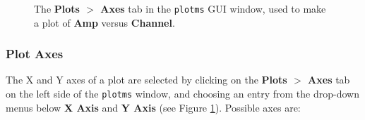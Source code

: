 
\begin{figure}[h!]
\begin{center}
\caption{\label{fig:plotms_axes} The {\bf Plots $>$ Axes} tab in the {\tt plotms} GUI window, used to make a plot of {\bf Amp} versus {\bf Channel}.} 
\hrulefill
\end{center}
\end{figure}

\subsubsection{Plot Axes}
\label{section:edit.plot.plotms.axes}

The X and Y axes of a plot are selected by clicking on the {\bf Plots $>$ Axes} tab on the left side of the {\tt plotms} window, and choosing an entry from the drop-down menus below {\bf X Axis} and {\bf Y Axis} (see Figure \ref{fig:plotms_axes}). Possible axes are:
